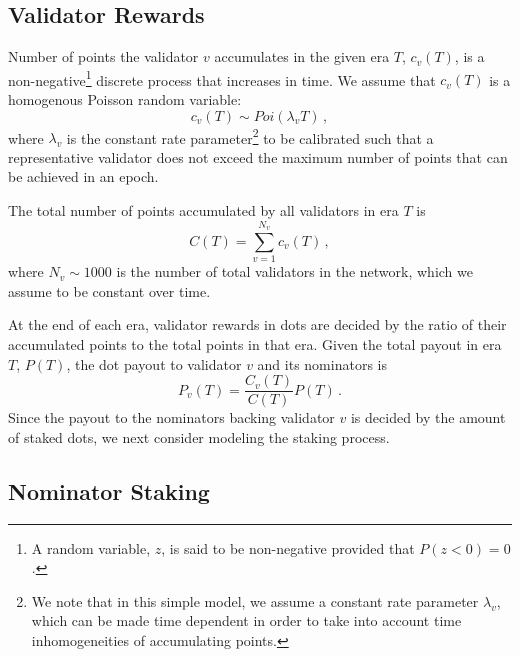 \documentclass[a4,11pt]{paper}
\def\be{\begin{equation}}
\def\ee{\end{equation}}
\newcommand{\per}{\, .}
\newcommand{\com}{\, ,}
\begin{document}
\subsection{Validator Rewards}

Number of points the validator $v$ accumulates in the given era $T$, $c_v(T)$, is a non-negative\footnote{A random variable, $z$, is said to be non-negative provided that $P(z<0) = 0$.}
 discrete process that increases in time. We assume that $c_v(T)$ is a homogenous Poisson random variable:
\be
c_v(T) \sim Poi(\lambda_v T) \com
\ee
where $\lambda_v$ is the constant rate parameter\footnote{We note that in this simple model, we assume a constant rate parameter $\lambda_v$, which can be made time dependent in order to take into account time inhomogeneities of accumulating points.}
 to be calibrated such that a representative validator does not exceed the maximum number of points that can be achieved in an epoch.

The total number of points accumulated by all validators in era $T$ is
\be
C(T) = \sum_{v = 1}^{N_v} c_v (T) \com
\ee
where $N_v \sim 1000$ is the number of total validators in the network, which we assume to be constant over time.

At the end of each era, validator rewards in dots are decided by the ratio of their accumulated points to the total points in that era. Given the total payout in era $T$, $P(T)$, the dot payout to validator $v$ and its nominators is
\be
P_v(T) = \frac{C_v(T)}{C(T)} P(T) \per
\ee
Since the payout to the nominators backing validator $v$ is decided by the amount of staked dots, we next consider modeling the staking process.

\subsection{Nominator Staking}
\end{document}
